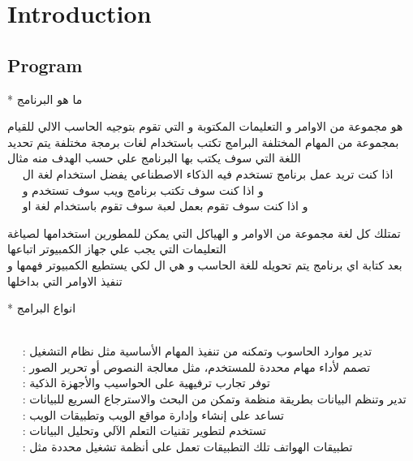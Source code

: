   \setcounter{page}{0}
  \tableofcontents
  \thispagestyle{empty}

  \chapter{Introduction}
  \thispagestyle{empty}
  \section{Program}
  \begin{AR}
    * ما هو البرنامج 

    هو مجموعة من الاوامر و التعليمات المكتوبة و التي تقوم
    بتوجيه الحاسب الالي للقيام بمجموعة من المهام المختلفة
    البرامج تكتب باستخدام لغات برمجة مختلفة يتم تحديد
    اللغة التي سوف يكتب بها البرنامج علي حسب الهدف منه مثال 
\\
\ \ \LR{\textcolor{theme}{•}}    اذا كنت تريد عمل برنامج تستخدم فيه الذكاء الاصطناعي يفضل استخدام لغة ال 
\\
\ \ \LR{\textcolor{theme}{•}}    و اذا كنت سوف تكتب برنامج ويب سوف تستخدم  و 
\\
\ \ \LR{\textcolor{theme}{•}}    و اذا كنت سوف تقوم بعمل لعبة سوف تقوم باستخدام لغة  او 

تمتلك كل لغة مجموعة من الاوامر و الهياكل التي يمكن 
    للمطورين استخدامها لصياغة التعليمات التي يجب علي جهاز الكمبيوتر اتباعها 
\\  بعد كتابة اي برنامج يتم تحويله للغة الحاسب و هي ال 
    لكي يستطيع الكمبيوتر فهمها و تنفيذ الاوامر التي بداخلها 

    * انواع البرامج

\\
\ \ \LR{\textcolor{theme}{•}}    : تدير موارد الحاسوب وتمكنه من تنفيذ المهام الأساسية مثل نظام التشغيل
\\
\ \ \LR{\textcolor{theme}{•}}     : تصمم لأداء مهام محددة للمستخدم، مثل معالجة النصوص أو تحرير الصور
\\
\ \ \LR{\textcolor{theme}{•}}     : توفر تجارب ترفيهية على الحواسيب والأجهزة الذكية
\\
\ \ \LR{\textcolor{theme}{•}}     : تدير وتنظم البيانات بطريقة منظمة وتمكن من البحث والاسترجاع السريع للبيانات
\\
\ \ \LR{\textcolor{theme}{•}}   : تساعد على إنشاء وإدارة مواقع الويب وتطبيقات الويب
\\
\ \ \LR{\textcolor{theme}{•}}   : تستخدم لتطوير تقنيات التعلم الآلي وتحليل البيانات
\\
\ \ \LR{\textcolor{theme}{•}}   : تطبيقات الهواتف تلك التطبيقات تعمل على أنظمة تشغيل محددة مثل 
  \end{AR}

